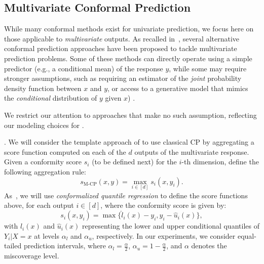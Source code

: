 \subsection{Multivariate Conformal Prediction}
While many conformal methods exist for univariate prediction, we focus here on those applicable to \textit{multivariate} outputs.  As recalled in~\citep{dheur2025multioutputconformalregressionunified}, several alternative conformal prediction approaches have been proposed to tackle multivariate prediction problems. Some of these methods can directly operate using a simple predictor (e.g., a conditional mean) of the response $y$, while some may require stronger assumptions, such as requiring an estimator of the \textit{joint} probability density function between $x$ and $y$, or access to a generative model that mimics the \textit{conditional} distribution of $y$ given $x$) \cite{izbicki2022cd, wang2022probabilistic}. 

We restrict our attention to approaches that make no such assumption, reflecting our modeling choices for \OTCP. 

\MCP.
We will consider the template approach of \cite{zhou2024conformalized} to use classical CP by aggregating a score function computed on each of the $d$ outputs of the multivariate response. Given a conformity score \( s_i \) (to be defined next) for the \( i \)-th dimension, \citet{zhou2024conformalized} define the following aggregation rule:
\begin{equation}
    s_{\text{M-CP}}(x, y) = \max_{i \in [d]} s_i(x, y_i).
    \label{eq:simultaneous_score}
\end{equation}
As~\citep{dheur2025multioutputconformalregressionunified}, we will use \textit{conformalized quantile regression} \citep{romano2019conformalized} to define the score functions above, for each output \( i \in [d] \), where the conformity score is given by:
\[
s_i(x, y_i) = \max\{\hat{l}_i(x) - y_i, y_i - \hat{u}_i(x)\},
\]
with \( \hat{l}_i(x) \) and \( \hat{u}_i(x) \) representing the lower and upper conditional quantiles of \( Y_i|X=x\) at levels \( \alpha_l \) and \( \alpha_u \), respectively. In our experiments, we consider equal-tailed prediction intervals, where \( \alpha_l = \frac{\alpha}{2} \), \( \alpha_u = 1 - \frac{\alpha}{2} \), and \( \alpha \) denotes the miscoverage level. 

